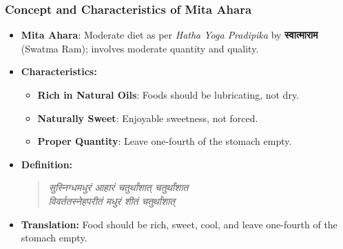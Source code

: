 \begin{frame}[fragile]\frametitle{Concept and Characteristics of Mita Ahara}

\begin{itemize}
    \item \textbf{Mita Ahara}: Moderate diet as per \textit{Hatha Yoga Pradipika} by \textbf{स्वात्माराम} (Swatma Ram); involves moderate quantity and quality.
    \item \textbf{Characteristics:}
        \begin{itemize}
            \item \textbf{Rich in Natural Oils}: Foods should be lubricating, not dry.
            \item \textbf{Naturally Sweet}: Enjoyable sweetness, not forced.
            \item \textbf{Proper Quantity}: Leave one-fourth of the stomach empty.
        \end{itemize}
    \item \textbf{Definition:}
        \begin{quote}
            \textit{सुस्निग्धमधुरं आहारं चतुर्थांशात् चतुर्थांशात \\ 
            विवर्ततस्नेहपरीतं मधुरं शीतं चतुर्थांशात्}
        \end{quote}
    \item \textbf{Translation:} Food should be rich, sweet, cool, and leave one-fourth of the stomach empty.
\end{itemize}

\end{frame}





